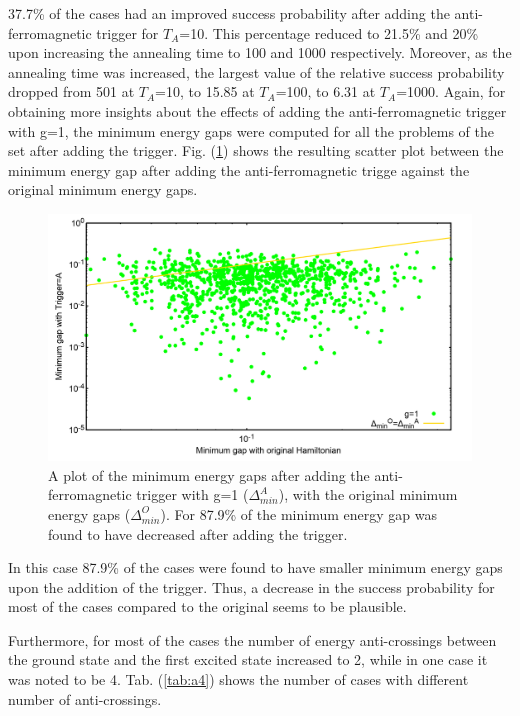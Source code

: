 \documentclass[../main.tex]{subfiles}
\begin{document}
37.7\% of the cases had an improved success probability after adding the anti-ferromagnetic trigger for $T_A$=10. This percentage reduced to 21.5\% and 20\% upon increasing the annealing time to 100 and 1000 respectively. Moreover, as the annealing time was increased, the largest value of the relative success probability dropped from 501 at $T_A$=10, to 15.85 at $T_A$=100, to 6.31 at $T_A$=1000. Again, for obtaining more insights about the effects of adding the anti-ferromagnetic trigger with g=1, the minimum energy gaps were computed for all the problems of the set after adding the trigger. Fig. (\ref{fig:a21}) shows the resulting scatter plot between the minimum energy gap after adding the anti-ferromagnetic trigge against the original minimum energy gaps.

\begin{figure}[H]
\centering 
\includegraphics[scale=0.2]{MinGap_A_g1.png}
\caption{A plot of the minimum energy gaps after adding the anti-ferromagnetic trigger with g=1 ($\Delta_{min}^A$), with the original minimum energy gaps ($\Delta_{min}^O$). For 87.9\% of the minimum energy gap was found to have decreased after adding the trigger.}
\label{fig:a21}
\end{figure}
In this case 87.9\% of the cases were found to have smaller minimum energy gaps upon the addition of the trigger. Thus, a decrease in the success probability for most of the cases compared to the original seems to be plausible.

Furthermore, for most of the cases the number of  energy anti-crossings between the ground state and the first excited state increased to 2, while in one case it was noted to be 4. Tab. (\ref{tab:a4}) shows the number of cases with different number of anti-crossings.
\end{document}
